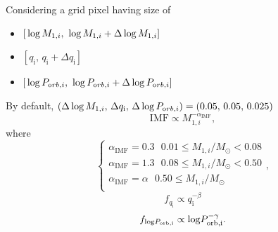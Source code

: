 \documentclass{article}
\begin{document}
\begin{minipage}{0.5\linewidth}
Considering a grid pixel having size of 
	\begin{itemize}
		\item $[{\rm \,log\,} M_{\mathrm 1,i},\,{\rm \,log\,} M_{\mathrm 1,i}+\Delta{\rm \,log\,} M_{\mathrm 1,i}]$
		\item $[q_{\mathrm i},\,q_{\mathrm i}+\Delta q_{\mathrm i}]$
		\item $[{\rm \,log\,} P_{\mathrm orb,i},\,{\rm \,log\,} P_{\mathrm orb,i}+\Delta{\rm \,log\,} P_{\mathrm orb,i}]$
	\end{itemize}
	By default, \newline$(\Delta{\rm \,log\,} M_{\mathrm 1,i},\,\Delta q_{\mathrm i},\, \Delta{\rm \,log\,} P_{\mathrm orb,i})=(0.05,\,0.05,\,0.025)$
\begin{equation}
	\mathrm{IMF} \propto M_{\mathrm 1,i}^{-\alpha_\mathrm{IMF}},
\end{equation}
where
\begin{equation}
	\begin{cases}
	    \alpha_\mathrm{IMF}=0.3~~~0.01\leq M_{\mathrm 1,i}/M_\odot < 0.08\\
		\alpha_\mathrm{IMF}=1.3~~~0.08\leq M_{\mathrm 1,i}/M_\odot < 0.50\\
		\alpha_\mathrm{IMF}=\alpha~~~0.50\leq M_{\mathrm 1,i}/M_\odot \\
	\end{cases},
	\label{IMF}
\end{equation}
\begin{equation}
    f_{q_{\mathrm i}} \propto q_{\mathrm i}^{-\beta}
    \label{f_qi}
\end{equation}
\begin{equation}
	f_{{\rm log}P_{\rm orb,i}} \propto {\rm log}P_{\rm orb,i}^{-\gamma}.
    \label{f_logpi}
\end{equation}
\end{minipage}
\end{document}
